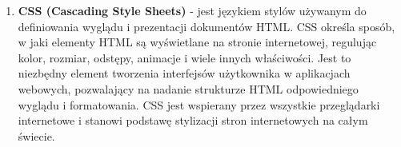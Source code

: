 \begin{enumerate}
    \item {\bf CSS (Cascading Style Sheets)} - jest językiem stylów używanym do definiowania wyglądu i prezentacji dokumentów HTML. CSS określa sposób, w jaki elementy HTML są wyświetlane na stronie internetowej, regulując kolor, rozmiar, odstępy, animacje i wiele innych właściwości. Jest to niezbędny element tworzenia interfejsów użytkownika w aplikacjach webowych, pozwalający na nadanie strukturze HTML odpowiedniego wyglądu i formatowania. CSS jest wspierany przez wszystkie przeglądarki internetowe i stanowi podstawę stylizacji stron internetowych na całym świecie.
     
 \end{enumerate}